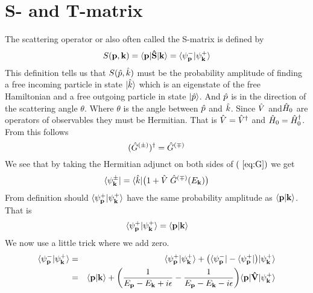 \section{S- and T-matrix}




The scattering operator or also often called the  S-matrix is defined by
%                                                 
\begin{equation}
S({\bf{p}},{\bf{k}})=\langle\bf{p}|\hat{S}|\bf{k}\rangle=\langle\psi_{\bf{p}}^{-}|\psi_{\bf{k}}^{+}\rangle 
\end{equation}
%                                                 
This definition tells us that $S(\hat{p},\hat{k})$ must be the probability
amplitude of finding a free incoming particle in state $|\hat{k}\rangle$ which is an 
eigenstate of the free Hamiltonian and a free outgoing particle in state $|\hat{p}\rangle$.
And $\hat{p}$ is in the direction of the scattering angle $\theta$. Where $\theta$ 
is the angle between $\hat{p}$ and $\hat{k}$. Since $\hat{V}$ 
and$\hat{H}_0$ are operators of observables they must be Hermitian. That is $\hat{V}=\hat{V}^\dagger$ and
$\hat{H}_{0}=\hat{H}^{\dagger}_{0}$. From this follows
%                                                 
\begin{equation}
(\hat{G}^{(\pm)})^\dagger=\hat{G}^{(\mp)}
\end{equation}
%                                                 
We  see that  by taking the Hermitian adjunct on both sides of $(~\ref{eq:G})$ 
we get
%                                                 
\begin{equation}\label{eq:Gdagger}
\bra{\psi_{\bf k}^{\pm}}=\bra{\op k}\big(1+\op{V}\;\op{G}^{(\mp)}(E_{\bf k})\big)
\end{equation}
%                                                 
From definition should $\langle\psi_{\bf{p}}^{+}|\psi_{\bf{k}}^{+}\rangle$ have
the same probability amplitude as $\langle\bf{p}|\bf{k}\rangle$. That is
%                                                 
\begin{equation}
\langle\psi_{\bf{p}}^{+}|\psi_{\bf{k}}^{+}\rangle=\langle\bf{p}|\bf{k}\rangle
\end{equation}
%                                                 
We now use a little trick where we add zero. 
%                                                 
\begin{eqnarray}
\langle\psi_{\bf{p}}^{-}|\psi_{\bf{k}}^{+}\rangle &=&
\langle\psi_{\bf{p}}^{+}|\psi_{\bf{k}}^{+}\rangle+\big(\langle\psi_{\bf{p}}^{-}|
-\langle\psi_{\bf{p}}^{+}|\big)|\psi_{\bf{k}}^{+}\rangle\nonumber\\
&=&
\langle{\bf{p}}|{\bf{k}}\rangle+\bigg( \frac{1}{E_{\bf{p}}-E_{\bf{k}}+i\epsilon}-
\frac{1}{E_{\bf{p}}-E_{\bf{k}}-i\epsilon}\bigg) \langle\bf{p}|\hat{V}|\psi_{{\bf k}}^{+}\rangle
\end{eqnarray}

